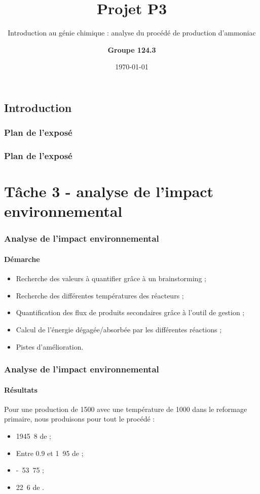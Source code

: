 \documentclass{beamer}
\title{Projet P3}
\subtitle{Introduction au génie chimique : analyse du procédé de production d'ammoniac}
\author{\textbf{Groupe 124.3}}
\institute{Ecole Polytechnique de Louvain}
\date{\today}
\begin{document}
 
 
	\begin{frame} 
		\titlepage 
	\end{frame} 
	
	\begin{frame}
		\section{Introduction}
		\frametitle{Plan de l'exposé}
		\tableofcontents[currentsubsection,sectionstyle=show/shaded,subsectionstyle=show/shaded/hide]
	\end{frame}
	
	\begin{frame}
		\frametitle{Plan de l'exposé}
		\section{Tâche 3 - analyse de l'impact environnemental}
		\tableofcontents[currentsubsection,sectionstyle=show/shaded,subsectionstyle=show/shaded/hide]
	\end{frame}
	
	\begin{frame}
	\frametitle{Analyse de l'impact environnemental}
	\framesubtitle{Démarche}
	\begin{itemize}
		\item Recherche des valeurs à quantifier grâce à un brainstorming ;
		\item Recherche des différentes températures des réacteurs ;
		\item Quantification des flux de produits secondaires grâce à l'outil de gestion ;
		\item Calcul de l'énergie dégagée/absorbée par les différentes réactions ;
		\item Pistes d'amélioration.
	\end{itemize}
	\end{frame}

	\begin{frame}
	\frametitle{Analyse de l'impact environnemental}
	\framesubtitle{Résultats}
	Pour une production de \unit{1500}{\ton\per\dday} avec une température 
	de \unit{1000}{\kelvin} dans le reformage primaire, nous produisons pour tout le procédé :
	\begin{itemize}
		\item \unit{1945.8}{\ton\per\dday} de \chemform{CO_2} ;
		\item Entre 0.9 et \unit{1.95}{\ton\per\dday} de \chemform{NO_x} ;
		\item \unit{-53.75}{\kilo\joule\per\dday} ;
		\item \unit{22.6}{\ton\per\dday} de \chemform{Ar}.
	\end{itemize}
	\end{frame}
\end{document}
